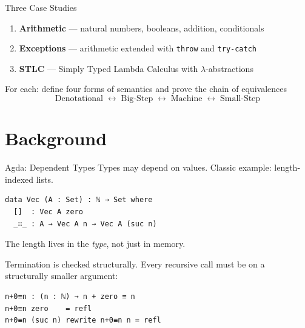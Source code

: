 \documentclass[10pt,compress,aspectratio=169]{beamer}
\begin{document}
\begin{frame}{Three Case Studies}
  \begin{enumerate}
    \item \textbf{Arithmetic} — natural numbers, booleans, addition, conditionals
    \item \textbf{Exceptions} — arithmetic extended with \texttt{throw} and \texttt{try-catch}
    \item \textbf{STLC} — Simply Typed Lambda Calculus with $\lambda$-abstractions
  \end{enumerate}
  \bigskip
  \begin{center}
    For each: define four forms of semantics and prove the chain of equivalences
    \[
      \text{Denotational}
      \;\longleftrightarrow\;
      \text{Big-Step}
      \;\longleftrightarrow\;
      \text{Machine}
      \;\longleftrightarrow\;
      \text{Small-Step}
    \]
  \end{center}
\end{frame}

\section{Background}

\begin{frame}[fragile]{Agda: Dependent Types}
  Types may depend on values. Classic example: length-indexed lists.

\begin{verbatim}
data Vec (A : Set) : ℕ → Set where
  []  : Vec A zero
  _∷_ : A → Vec A n → Vec A (suc n)
\end{verbatim}

  The length lives in the \emph{type}, not just in memory.
  \bigskip

  Termination is checked structurally. Every recursive call must be on a structurally smaller argument:

\begin{verbatim}
n+0≡n : (n : ℕ) → n + zero ≡ n
n+0≡n zero    = refl
n+0≡n (suc n) rewrite n+0≡n n = refl
\end{verbatim}
\end{frame}
\end{document}
